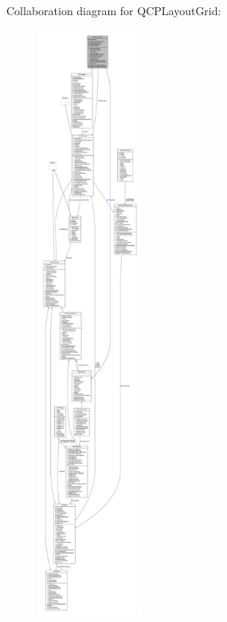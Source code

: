 Collaboration diagram for Q\+C\+P\+Layout\+Grid\+:\nopagebreak
\begin{figure}[H]
\begin{center}
\leavevmode
\includegraphics[height=550pt]{class_q_c_p_layout_grid__coll__graph}
\end{center}
\end{figure}
